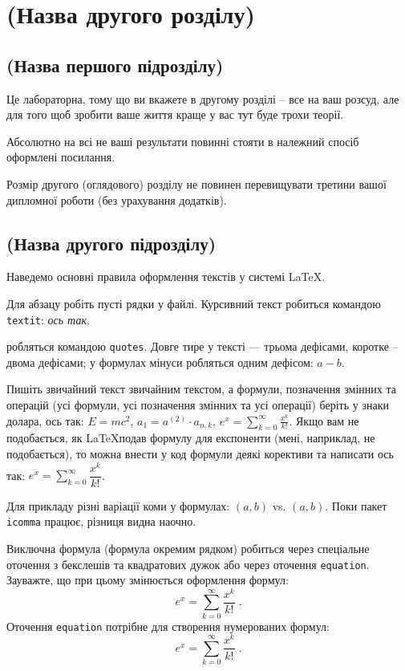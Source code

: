 
\chapter{(Назва другого розділу)}
\label{chap:review}

\section{(Назва першого підрозділу)}

Це лабораторна, тому що ви вкажете в другому розділі -- все на ваш розсуд, але для того щоб зробити ваше життя краще у вас тут буде трохи теорії.

Абсолютно на всі не ваші результати повинні стояти 
в належний спосіб оформлені посилання.

Розмір другого (оглядового) розділу не повинен перевищувати третини вашої 
дипломної роботи (без урахування додатків).


\section{(Назва другого підрозділу)}

Наведемо основні правила оформлення текстів у системі \LaTeX.

Для абзацу робіть пусті рядки у файлі. Курсивний текст робиться командою 
\texttt{textit}: \textit{ось так}. 

 робляться командою \texttt{quotes}. Довге 
тире у тексті --- трьома дефісами, коротке -- двома дефісами; у формулах 
мінуси робляться одним дефісом: $a-b$.

Пишіть звичайний текст звичайним текстом, а формули, позначення змінних та 
операцій (усі формули, усі позначення змінних та усі операції) беріть у 
знаки долара, ось так: $E = mc^2$, $a_1 = a^{(2)} \cdot a_{n, k}$, $e^x = 
\sum_{k = 0}^{\infty} {\frac{x^k}{k!}}$. Якщо вам 
не подобається, як \LaTeX подав формулу для експоненти (мені, наприклад, 
не подобається), то можна внести у код формули деякі корективи та написати ось так: $e^x 
= \sum\limits_{k = 0}^{\infty} {\dfrac{x^k}{k!}}$.

Для прикладу різні варіації коми у формулах: $(a, b)$ vs. $(a,b)$. Поки 
пакет \texttt{icomma} працює, різниця видна наочно.

Виключна формула (формула окремим рядком) робиться через спеціальне оточення з бекслешів та квадратових дужок або через оточення \texttt{equation}. Зауважте, що при цьому змінюється 
оформлення формул:
\[
e^x = \sum_{k = 0}^{\infty} {\frac{x^k}{k!}}\;.
\]
Оточення \texttt{equation} потрібне для створення нумерованих формул:
\begin{equation}
e^x = \sum_{k = 0}^{\infty} {\frac{x^k}{k!}}\;.
\label{eq:exponent}
\end{equation}

